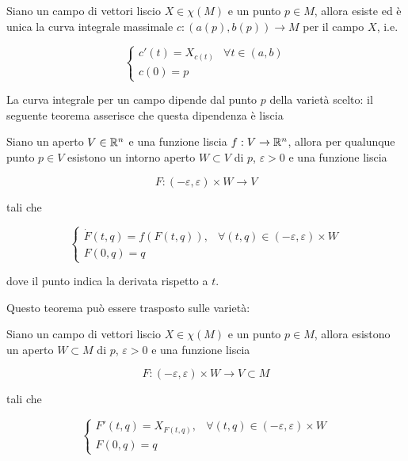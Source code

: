 
\begin{theorem}
	Siano un campo di vettori liscio $ X \in \chi(M) $ e un punto $ p \in M $, allora esiste ed è unica la curva integrale massimale $ c : (a(p),b(p)) \to M $ per il campo $ X $, i.e.
	
	\begin{equation}
		\begin{cases}
			c'(t) = X_{c(t)} & \forall t \in (a,b) \\
			c(0) = p
		\end{cases}
	\end{equation}
\end{theorem}

La curva integrale per un campo dipende dal punto $ p $ della varietà scelto: il seguente teorema asserisce che questa dipendenza è liscia

\begin{theorem}
	Siano un aperto $ V \in \mathbb{R}^{n} $ e una funzione liscia $ f : V \to \mathbb{R}^{n} $, allora per qualunque punto $ p \in V $ esistono un intorno aperto $ W \subset V $ di $ p $, $ \varepsilon > 0 $ e una funzione liscia
	
	\begin{equation}
		F : (-\varepsilon,\varepsilon) \times W \to V
	\end{equation}

	tali che
	
	\begin{equation}
		\begin{cases}
			\dot{F}(t,q) = f(F(t,q)), & \forall (t,q) \in (-\varepsilon,\varepsilon) \times W \\
			F(0,q) = q
		\end{cases}
	\end{equation}

	dove il punto indica la derivata rispetto a $ t $.
\end{theorem}

Questo teorema può essere trasposto sulle varietà:

\begin{theorem}\label{thm:flux-var}
	Siano un campo di vettori liscio $ X \in \chi(M) $ e un punto $ p \in M $, allora esistono un aperto $ W \subset M $ di $ p $, $ \varepsilon > 0 $ e una funzione liscia
	
	\begin{equation}
		F : (-\varepsilon,\varepsilon) \times W \to V \subset M
	\end{equation}

	tali che
	
	\begin{equation}
		\begin{cases}
			F'(t,q) = X_{F(t,q)}, & \forall (t,q) \in (-\varepsilon,\varepsilon) \times W \\
			F(0,q) = q
		\end{cases}
	\end{equation}
\end{theorem}

